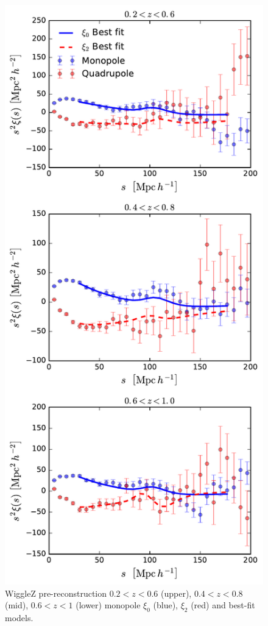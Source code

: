\documentclass[iop,twocolappendix]{emulateapj}
\begin{document}
\begin{figure}[!h]
	\begin{center}
		\includegraphics[width=\columnwidth]{images/prerecon_result.pdf}
		\caption{\label{fig:prerecon_result}  WiggleZ pre-reconstruction $0.2<z<0.6$ (upper), $0.4<z<0.8$ (mid), $0.6<z<1$ (lower) monopole $\xi_{0}$ (blue), $\xi_{2}$ (red) and best-fit models.%
		}
	\end{center}
\end{figure}
\end{document}
